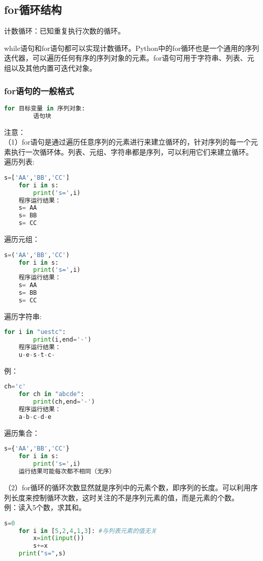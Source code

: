 \documentclass[11pt,a4paper]{article}
\begin{document}
\subsection{for循环结构}

计数循环：已知重复执行次数的循环。

while语句和for语句都可以实现计数循环。Python中的for循环也是一个通用的序列迭代器，可以遍历任何有序的序列对象的元素。for语句可用于字符串、列表、元组以及其他内置可迭代对象。

\subsubsection{for语句的一般格式}

\begin{lstlisting}[language={Python}]
    for 目标变量 in 序列对象:
        语句块
\end{lstlisting}
注意：\\
（1）for语句是通过遍历任意序列的元素进行来建立循环的，针对序列的每一个元素执行一次循环体。列表、元组、字符串都是序列，可以利用它们来建立循环。\\
遍历列表:
\begin{lstlisting}[language={Python}]
    s=['AA','BB','CC']
    for i in s:
        print('s=',i)
    程序运行结果：
    s= AA
    s= BB
    s= CC
\end{lstlisting}
遍历元组：
\begin{lstlisting}[language={Python}]
    s=('AA','BB','CC')
    for i in s:
        print('s=',i)
    程序运行结果：
    s= AA
    s= BB
    s= CC 
\end{lstlisting}
遍历字符串:
\begin{lstlisting}[language={Python}]
    for i in "uestc":
        print(i,end='-')
    程序运行结果：
    u-e-s-t-c-
\end{lstlisting}
例：
\begin{lstlisting}[language={Python}]
    ch='c'
    for ch in "abcde":
        print(ch,end='-')
    程序运行结果：
    a-b-c-d-e
\end{lstlisting}
遍历集合：
\begin{lstlisting}[language={Python}]
    s={'AA','BB','CC'}
    for i in s:
        print('s=',i)
    运行结果可能每次都不相同（无序）
\end{lstlisting}
（2）for循环的循环次数显然就是序列中的元素个数，即序列的长度。可以利用序列长度来控制循环次数，这时关注的不是序列元素的值，而是元素的个数。\\
例：读入5个数，求其和。
\begin{lstlisting}[language={Python}]
    s=0
    for i in [5,2,4,1,3]: #与列表元素的值无关
        x=int(input())
        s+=x
    print("s=",s)
\end{lstlisting}
\end{document}
